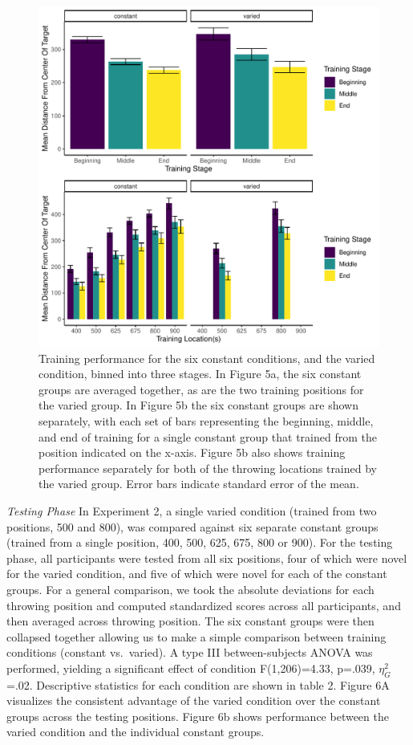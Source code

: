 \documentclass[
  man,floatsintext]{apa7}
\begin{document}
\begin{figure}
\centering
\includegraphics{IGAS_PJ_files/figure-latex/e2train-1.pdf}
\caption{\label{fig:e2train}Training performance for the six constant conditions, and the varied condition, binned into three stages. In Figure 5a, the six constant groups are averaged together, as are the two training positions for the varied group. In Figure 5b the six constant groups are shown separately, with each set of bars representing the beginning, middle, and end of training for a single constant group that trained from the position indicated on the x-axis. Figure 5b also shows training performance separately for both of the throwing locations trained by the varied group. Error bars indicate standard error of the mean.}
\end{figure}

\emph{Testing Phase}
In Experiment 2, a single varied condition (trained from two positions, 500 and 800), was compared against six separate constant groups (trained from a single position, 400, 500, 625, 675, 800 or 900). For the testing phase, all participants were tested from all six positions, four of which were novel for the varied condition, and five of which were novel for each of the constant groups. For a general comparison, we took the absolute deviations for each throwing position and computed standardized scores across all participants, and then averaged across throwing position. The six constant groups were then collapsed together allowing us to make a simple comparison between training conditions (constant vs.~varied). A type III between-subjects ANOVA was performed, yielding a significant effect of condition F(1,206)=4.33, p=.039, \(\eta^{2}_G\) =.02. Descriptive statistics for each condition are shown in table 2. Figure 6A visualizes the consistent advantage of the varied condition over the constant groups across the testing positions. Figure 6b shows performance between the varied condition and the individual constant groups.
\end{document}
